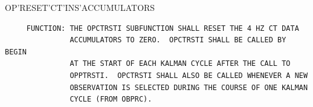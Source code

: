 \begin{frame}
OP'RESET'CT'INS'ACCUMULATORS
\begin{verbatim}
     FUNCTION: THE OPCTRSTI SUBFUNCTION SHALL RESET THE 4 HZ CT DATA
               ACCUMULATORS TO ZERO.  OPCTRSTI SHALL BE CALLED BY BEGIN
               AT THE START OF EACH KALMAN CYCLE AFTER THE CALL TO
               OPPTRSTI.  OPCTRSTI SHALL ALSO BE CALLED WHENEVER A NEW
               OBSERVATION IS SELECTED DURING THE COURSE OF ONE KALMAN
               CYCLE (FROM OBPRC).

\end{verbatim}
\end{frame}
